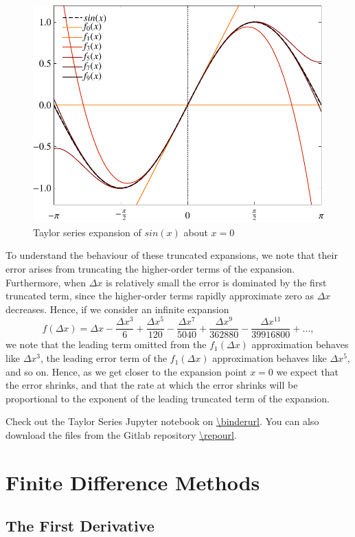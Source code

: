 \begin{figure}[htbp]
	\centering
	\includegraphics[width=0.6\linewidth]{Pictures/taylor_series_sin}
	\caption{Taylor series expansion of $sin(x)$ about $x=0$}
	\label{fig:taylor_series}
\end{figure}

To understand the behaviour of these truncated expansions, we note that their error arises from truncating the higher-order terms of the expansion. Furthermore, when $\Delta x$ is relatively small the error is dominated by the first truncated term, since the higher-order terms rapidly approximate zero as $\Delta x$ decreases. Hence, if we consider an infinite expansion
\begin{equation}
	f(\Delta x) = \Delta x - \frac{\Delta x^3}{6} + \frac{\Delta x^5}{120} - \frac{\Delta x^7}{5040} + \frac{\Delta x^9}{362880} - \frac{\Delta x^{11}}{39916800} + \hdots,
\end{equation}
we note that the leading term omitted from the $f_1(\Delta x)$ approximation behaves like $\Delta x^3$, the leading error term of the $f_1(\Delta x)$ approximation behaves like $\Delta x^5$, and so on. Hence, as we get closer to the expansion point $x=0$ we expect that the error shrinks, and that the rate at which the error shrinks will be proportional to the exponent of the leading truncated term of the expansion.
\begin{jupyternote}
	Check out the Taylor Series Jupyter notebook on \url{\binderurl}. You can also download the files from the Gitlab repository \url{\repourl}.
\end{jupyternote}
\chapter{Finite Difference Methods}
\section{The First Derivative}

